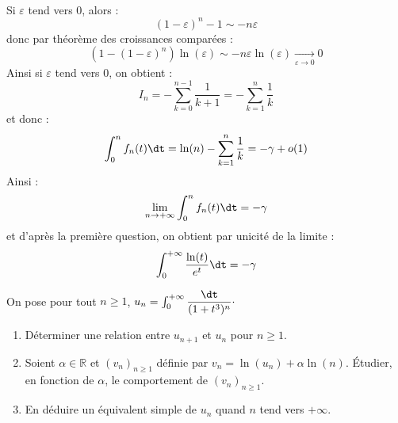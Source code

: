 \documentclass[a4paper,10pt]{report}
\begin{document}
\begin{enumerate}
\begin{align*}
 \end{align*}
 Si $\varepsilon$ tend vers $0$, alors :
 $$ (1- \varepsilon)^n -1 \sim -n \varepsilon$$
 donc par théorème des croissances comparées :
 $$ (1-(1- \varepsilon)^n)\ln(\varepsilon) \sim - n \varepsilon \ln(\varepsilon) \underset{\varepsilon \rightarrow 0}{\longrightarrow} 0$$
 Ainsi si $\varepsilon$ tend vers $0$, on obtient :
 $$ I_n = - \sum_{k=0}^{n-1} \dfrac{1}{k+1} = - \sum_{k=1}^n \dfrac{1}{k}$$
 et donc :
 $$ \int_{0}^n f_n(t) \dt = \ln(n)  - \sum_{k=1}^n \dfrac{1}{k} = -\gamma + o(1)$$
 Ainsi :
 $$ \lim_{n \rightarrow + \infty} \int_{0}^n f_n(t) \dt = - \gamma$$
 et d'après la première question, on obtient par unicité de la limite : 
 $$  \int_{0}^{+ \infty} \dfrac{\ln(t)}{e^t} \dt = - \gamma $$
\end{enumerate}

\begin{Exercice}{} On pose pour tout $n \geq 1$, $u_n = \int_{0}^{+ \infty} \dfrac{\dt}{(1+t^3)^n} \cdot$
\begin{enumerate}
\item Déterminer une relation entre $u_{n+1}$ et $u_n$ pour $n \geq 1$.
\item Soient $\alpha \in \mathbb{R}$ et $(v_n)_{n \geq 1}$ définie par $v_n = \ln(u_n) + \alpha \ln(n)$. Étudier, en fonction de $\alpha$, le comportement de $(v_n)_{n \geq 1}$.
\item En déduire un équivalent simple de $u_n$ quand $n$ tend vers $+ \infty$.
\end{enumerate}
\end{Exercice} 
\end{document}
